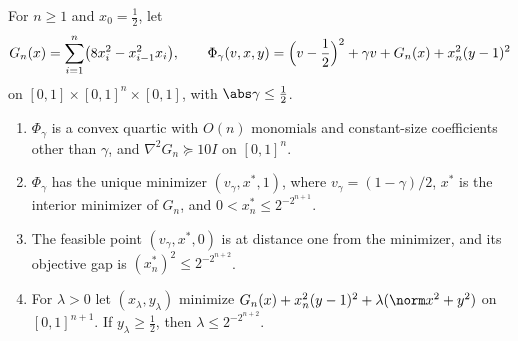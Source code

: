 \begin{proposition}\label{prop:lim:value}
For $n\ge1$ and $x_0=\frac12$, let
\[
 G_n(x)=\sum_{i=1}^n\bigl(8x_i^2-x_{i-1}^2x_i\bigr),\qquad
 \Phi_\gamma(v,x,y)=\Bigl(v-\frac12\Bigr)^2+\gamma v+G_n(x)+x_n^2(y-1)^2
\]
on $[0,1]\times[0,1]^n\times[0,1]$, with $\abs\gamma\le\frac12$.
\begin{enumerate}[label=(\alph*)]
\item\label{it:lim:val-convex} $\Phi_\gamma$ is a convex quartic with
$O(n)$ monomials and constant-size coefficients other than $\gamma$, and
$\nabla^2G_n\succeq10I$ on $[0,1]^n$.
\item\label{it:lim:val-opt} $\Phi_\gamma$ has the unique minimizer
$(v_\gamma,x^*,1)$, where $v_\gamma=(1-\gamma)/2$, $x^*$ is the interior
minimizer of $G_n$, and $0<x_n^*\le2^{-2^{n+1}}$.
\item\label{it:lim:val-gap} The feasible point $(v_\gamma,x^*,0)$ is at
distance one from the minimizer, and its objective gap is
$(x_n^*)^2\le2^{-2^{n+2}}$.
\item\label{it:lim:val-tikhonov} For $\lambda>0$ let $(x_\lambda,y_\lambda)$
minimize $G_n(x)+x_n^2(y-1)^2+\lambda(\norm x^2+y^2)$ on $[0,1]^{n+1}$. If
$y_\lambda\ge\frac12$, then $\lambda\le2^{-2^{n+2}}$.
\end{enumerate}
\end{proposition}

